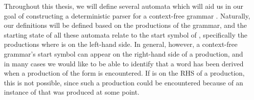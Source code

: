 \begin{isabellebody}
\begin{isamarkuptext}
\end{isamarkuptext}\isamarkuptrue%
%
\isadelimdocument
%
\endisadelimdocument
%
\isatagdocument
%
\isamarkuptrue%
%
\isamarkuptrue%
%
\isamarkuptrue%
%
\endisatagdocument
{\isafolddocument}%
%
\isadelimdocument
%
\endisadelimdocument
%
\isadelimproof
%
\endisadelimproof
%
\isatagproof
%
\endisatagproof
{\isafoldproof}%
%
\isadelimproof
%
\endisadelimproof
%
\begin{isamarkuptext}%
Throughout this thesis, we will define several automata which will aid us in our goal of 
constructing a deterministic  parser for a context-free grammar . Naturally, our 
definitions will be defined based on the productions of the grammar, and the starting state of all 
these automata relate to the start symbol  of , specifically the productions where 
 is
on the left-hand side. In general, however, a context-free grammar's start symbol can appear on the right-hand 
side of a production, and in many cases we would like to be able to identify that a word has been 
derived when a production of the form  is encountered. If  is
on the RHS of a production, this is not possible, since such a production could be encountered because
of an instance of  that was produced at some point.


\end{isamarkuptext}
\end{isabellebody}
